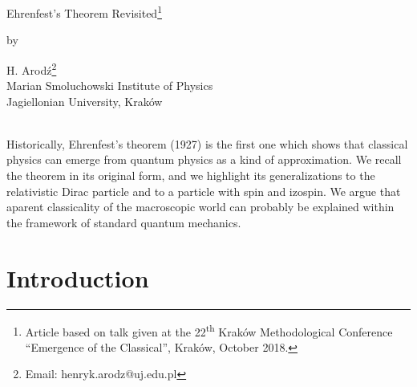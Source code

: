 \documentclass[12pt]{article}
\begin{document}
\begin{center}
{\large Ehrenfest's Theorem Revisited\footnote{Article based on talk given at the 22\textsuperscript{th} Krak\'ow Methodological Conference ``Emergence of the Classical'', Krak\'ow, October 2018. }} \\
\end{center}

\begin{center} by \end{center}

\begin{center}
H. Arod\'z\footnote{Email: henryk.arodz@uj.edu.pl} \\ \vspace*{0.2cm} Marian Smoluchowski Institute of Physics \\ Jagiellonian University, Krak\'ow 
\end{center}

\vspace*{1cm}
 \\
Historically, Ehrenfest's theorem (1927) is the first one which shows that classical physics can emerge from quantum physics as a kind of approximation. We recall the theorem in its original form, and we highlight its generalizations to the relativistic Dirac particle and to a particle with spin and izospin. We argue that aparent classicality of the macroscopic world can probably be explained within the framework of standard quantum mechanics.



\vspace*{0.5cm}

\section{Introduction}
\end{document}
